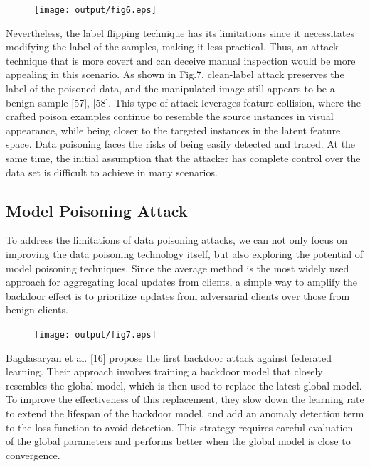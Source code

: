 \begin{figure}[h]
    \centering
    \texttt{[image: output/fig6.eps]}
     \caption{}
     \label{fig6}
\end{figure}

Nevertheless, the label flipping technique has its
limitations since it necessitates modifying the label of the
samples, making it less practical. Thus, an attack technique
that is more covert and can deceive manual inspection
would be more appealing in this scenario. As shown in
Fig.7, clean-label attack preserves the label of the poisoned
data, and the manipulated image still appears to be a
benign sample [57], [58]. This type of attack leverages feature
collision, where the crafted poison examples continue to
resemble the source instances in visual appearance, while
being closer to the targeted instances in the latent feature
space. Data poisoning faces the risks of being easily detected
and traced. At the same time, the initial assumption that
the attacker has complete control over the data set is
diﬀicult to achieve in many scenarios. 

\subsection{Model Poisoning Attack}
To address the limitations of data poisoning attacks,
we can not only focus on improving the data poisoning
technology itself, but also exploring the potential of model
poisoning techniques. Since the average method is the
most widely used approach for aggregating local updates
from clients, a simple way to amplify the backdoor effect
is to prioritize updates from adversarial clients over those
from benign clients. 

\begin{figure}[h]
    \centering
    \texttt{[image: output/fig7.eps]}
     \caption{}
     \label{fig7}
\end{figure}

Bagdasaryan et al. [16] propose the first backdoor
attack against federated learning. Their approach involves
training a backdoor model that closely resembles the
global model, which is then used to replace the latest
global model. To improve the effectiveness of this
replacement, they slow down the learning rate to extend
the lifespan of the backdoor model, and add an anomaly
detection term to the loss function to avoid detection.
This strategy requires careful evaluation of the global
parameters and performs better when the global model
is close to convergence.  

